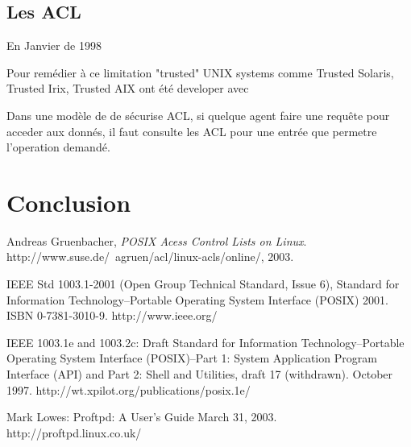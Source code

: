 \documentclass[draft]{article}
\begin{document}

\subsection*{Les ACL}



En Janvier de 1998\cite{aclsuse}

Pour remédier à ce limitation "trusted" UNIX systems comme Trusted Solaris, Trusted Irix, Trusted AIX ont été developer avec 

Dans une modèle de de sécurise ACL, si quelque agent faire une requête pour acceder aux donnés, il faut consulte les ACL pour une entrée que permetre l'operation demandé.    



\section*{Conclusion}

\begin{thebibliography}{9}


 
  Andreas Gruenbacher,
  \emph{POSIX Acess Control Lists on Linux}.
  http://www.suse.de/~agruen/acl/linux-acls/online/,
  2003.

    IEEE Std 1003.1-2001 (Open Group Technical Standard, Issue 6), 
	Standard for Information Technology--Portable Operating System Interface (POSIX) 2001. 
	ISBN 0-7381-3010-9. 
	http://www.ieee.org/

    IEEE 1003.1e and 1003.2c: Draft Standard for Information Technology--Portable Operating System Interface (POSIX)--Part 1: System Application Program Interface (API) and Part 2: Shell and Utilities, draft 17 (withdrawn). 
	October 1997. 
	http://wt.xpilot.org/publications/posix.1e/

	Mark Lowes: 
	Proftpd: 
	A User's Guide March 31, 2003. 
	http://proftpd.linux.co.uk/

\end{thebibliography}


\end{document}

